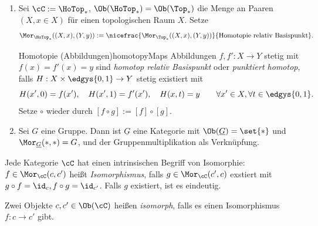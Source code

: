 \documentclass[language=ngerman]{TemplateLecture} %
\begin{document}
\begin{example}
\begin{enumerate}[$(i)$]
        Wir schreiben $[f]$ für die Homotopieklasse von $f$, und wälen $\circ: [f] \circ [g] := [f \circ g]$ als Komposition. Dies ist wohldefiniert (Übung!).
        \item Sei $\cC := \HoTop_*$, $\Ob(\HoTop_*) = \Ob(\Top_*)$ die Menge an Paaren $(X, x \in X)$ für einen topologischen Raum $X$. Setze 
        \begin{equation*}
            \Mor_{\HoTop_*}((X,x),(Y,y)) := \nicefrac{\Mor_{\Top_*}((X,x),(Y,y))}{\text{Homotopie relativ Basispunkt}}.
        \end{equation*}
        \begin{defi}{Homotopie (Abbildungen)}{homotopyMaps}
            Abbildungen $f, f': X \to Y$ stetig mit $f(x) = f'(x) = y$ sind \emph{homotop relativ Basispunkt} oder \emph{punktiert homotop}, falls $H: X \times \edgys{0,1} \to Y$ stetig existiert mit 
            \begin{equation*}
                H(x', 0) = f(x'), \quad H(x', 1) = f'(x'), \quad H(x,t) = y \quad \quad \forall x' \in X, \forall t \in \edgys{0,1}.
            \end{equation*}
            Setze $\circ$ wieder durch $[f \circ g] := [f] \circ [g]$.
        \end{defi}
        \item Sei $G$ eine Gruppe. Dann ist $\underline{G}$ eine Kategorie mit $\Ob(\underline{G}) = \set{*}$ und $\Mor_{\underline{G}}(*, *) = G$, und der Gruppenmultiplikation als Verknüpfung.
    \end{enumerate}
\end{example}

Jede Kategorie $\cC$ hat einen intrinsischen Begriff von Isomorphie: $f \in \Mor_\cC(c, c')$ heißt \emph{Isomorphismus}, falls $g \in \Mor_\cC(c',c)$ exstiert mit $g \circ f = \id_c, f \circ g = \id_{c'}$. Falls $g$ existiert, ist es eindeutig.

Zwei Objekte $c, c' \in \Ob(\cC)$ heißen \emph{isomorph}, falls es einen Isomorphismus $f: c \to c'$ gibt.
\end{document}
